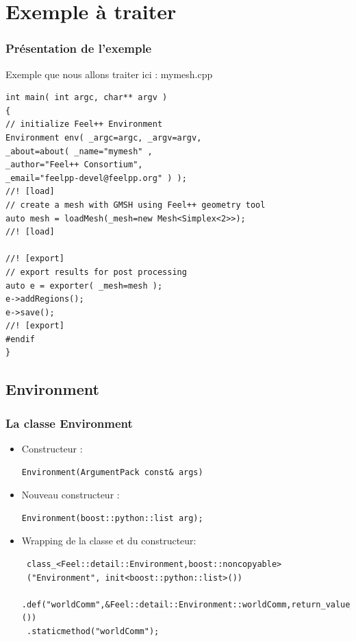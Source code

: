 \documentclass[french,10pt]{beamer}
\begin{document}
\section{Exemple à traiter}
\begin{frame}[fragile]
\frametitle{Présentation de l'exemple}
Exemple que nous allons traiter ici : mymesh.cpp
\begin{lstlisting}
int main( int argc, char** argv )
{
// initialize Feel++ Environment
Environment env( _argc=argc, _argv=argv,
_about=about( _name="mymesh" ,
_author="Feel++ Consortium",
_email="feelpp-devel@feelpp.org" ) );
//! [load]
// create a mesh with GMSH using Feel++ geometry tool
auto mesh = loadMesh(_mesh=new Mesh<Simplex<2>>);
//! [load]

//! [export]
// export results for post processing
auto e = exporter( _mesh=mesh );
e->addRegions();
e->save();
//! [export]
#endif
} 
\end{lstlisting}
\end{frame}

\subsection{Environment}
\begin{frame}[fragile]
\frametitle{La classe Environment}
\begin{itemize}
\item Constructeur :
\begin{lstlisting}
Environment(ArgumentPack const& args)
\end{lstlisting}
\item Nouveau constructeur :
\begin{lstlisting}
Environment(boost::python::list arg);
\end{lstlisting}
\item Wrapping de la classe et du constructeur:
\begin{lstlisting}
 class_<Feel::detail::Environment,boost::noncopyable>
 ("Environment", init<boost::python::list>())
 .def("worldComm",&Feel::detail::Environment::worldComm,return_value_policy<copy_non_const_reference>())
 .staticmethod("worldComm");
\end{lstlisting}
\end{itemize}
\end{frame}
\end{document}
